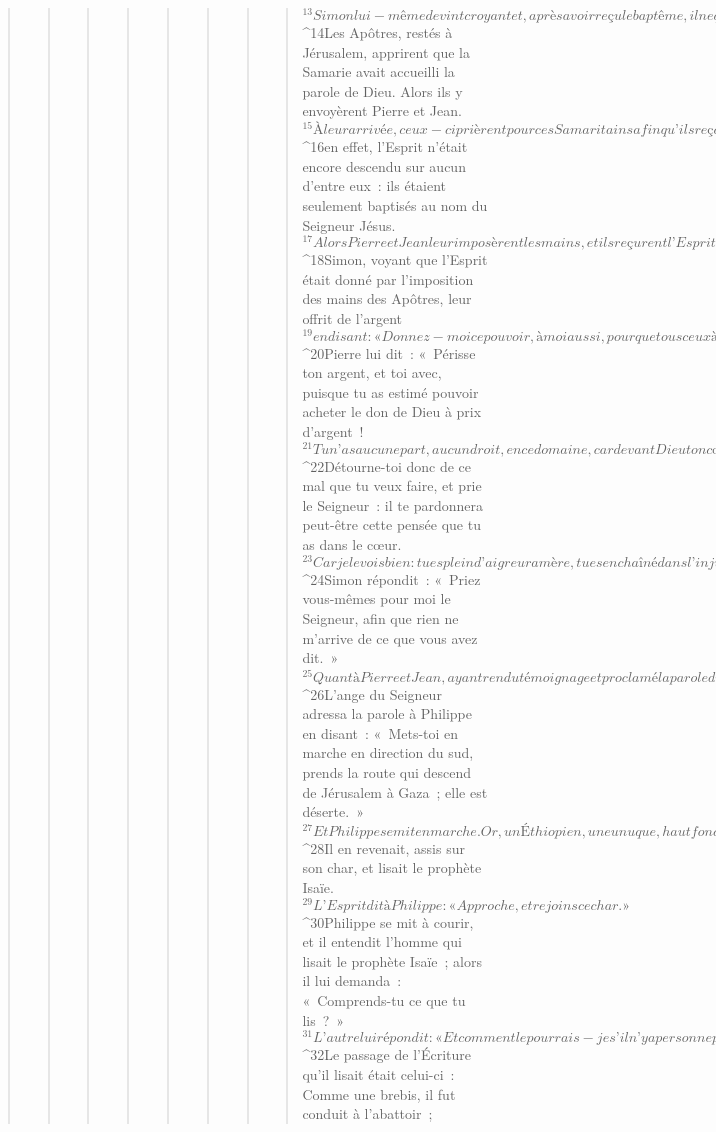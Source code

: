 \begin{verse}
\begin{verse}
\begin{verse}
\begin{verse}
\begin{verse}
\begin{verse}
\begin{verse}
\begin{verse}
${}^{13}Simon lui-même devint croyant et, après avoir reçu le baptême, il ne quittait plus Philippe ; voyant les signes et les actes de grande puissance qui se produisaient, il était stupéfait.
${}^{14}Les Apôtres, restés à Jérusalem, apprirent que la Samarie avait accueilli la parole de Dieu. Alors ils y envoyèrent Pierre et Jean. 
${}^{15}À leur arrivée, ceux-ci prièrent pour ces Samaritains afin qu’ils reçoivent l’Esprit Saint ; 
${}^{16}en effet, l’Esprit n’était encore descendu sur aucun d’entre eux : ils étaient seulement baptisés au nom du Seigneur Jésus. 
${}^{17}Alors Pierre et Jean leur imposèrent les mains, et ils reçurent l’Esprit Saint.
${}^{18}Simon, voyant que l’Esprit était donné par l’imposition des mains des Apôtres, leur offrit de l’argent 
${}^{19}en disant : « Donnez-moi ce pouvoir, à moi aussi, pour que tous ceux à qui j’imposerai les mains reçoivent l’Esprit Saint. » 
${}^{20}Pierre lui dit : « Périsse ton argent, et toi avec, puisque tu as estimé pouvoir acheter le don de Dieu à prix d’argent ! 
${}^{21}Tu n’as aucune part, aucun droit, en ce domaine, car devant Dieu ton cœur manque de droiture. 
${}^{22}Détourne-toi donc de ce mal que tu veux faire, et prie le Seigneur : il te pardonnera peut-être cette pensée que tu as dans le cœur. 
${}^{23}Car je le vois bien : tu es plein d’aigreur amère, tu es enchaîné dans l’injustice. » 
${}^{24}Simon répondit : « Priez vous-mêmes pour moi le Seigneur, afin que rien ne m’arrive de ce que vous avez dit. »
${}^{25}Quant à Pierre et Jean, ayant rendu témoignage et proclamé la parole du Seigneur, ils retournèrent à Jérusalem en annonçant l’Évangile à un grand nombre de villages samaritains.
${}^{26}L’ange du Seigneur adressa la parole à Philippe en disant : « Mets-toi en marche en direction du sud, prends la route qui descend de Jérusalem à Gaza ; elle est déserte. »
${}^{27}Et Philippe se mit en marche. Or, un Éthiopien, un eunuque, haut fonctionnaire de Candace, la reine d’Éthiopie, et administrateur de tous ses trésors, était venu à Jérusalem pour adorer. 
${}^{28}Il en revenait, assis sur son char, et lisait le prophète Isaïe. 
${}^{29}L’Esprit dit à Philippe : « Approche, et rejoins ce char. » 
${}^{30}Philippe se mit à courir, et il entendit l’homme qui lisait le prophète Isaïe ; alors il lui demanda : « Comprends-tu ce que tu lis ? » 
${}^{31}L’autre lui répondit : « Et comment le pourrais-je s’il n’y a personne pour me guider ? » Il invita donc Philippe à monter et à s’asseoir à côté de lui. 
${}^{32}Le passage de l’Écriture qu’il lisait était celui-ci :
        \\Comme une brebis, il fut conduit à l’abattoir ;

\end{verse}
\end{verse}
\end{verse}
\end{verse}
\end{verse}
\end{verse}
\end{verse}
\end{verse}
